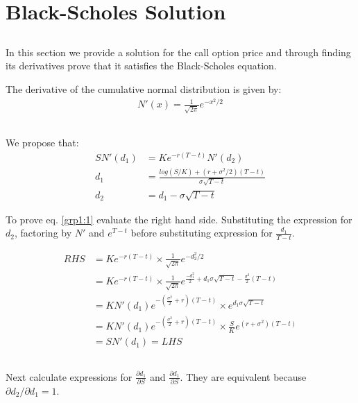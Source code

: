 \documentclass{sig-alternate-05-2015}
\begin{document}
\section{Black-Scholes Solution}
\subsection{}
In this section we provide a solution for the call option price and through finding its derivatives prove that it satisfies the Black-Scholes equation. 

The derivative of the cumulative normal distribution is given by:
\begin{align}
N'(x) = \frac{1}{\sqrt{2\pi}}e^{-x^2/2}
\end{align}

\subsection{}

We propose that:
\begin{subequations}\label{grp1}
\begin{align}
SN'(d_1) &= Ke^{-r(T-t)}N'(d_2)\label{grp1:1}\\
d_1 &= \frac{log(S/K) + (r+\sigma^2/2)(T-t)}{\sigma\sqrt{T-t}}\label{grp1:2}\\
d_2 &= d_1 - \sigma\sqrt{T-t}\label{grp1:3}
\end{align}
\end{subequations}

To prove eq. \ref{grp1:1} evaluate the right hand side. Substituting the expression for $d_2$, factoring by $N'$ and $e^{T-t}$ before
substituting expression for $\frac{d_1}{T-t}$.

\begin{align*}\label{grp2}
RHS &= Ke^{-r(T-t)}\times \frac{1}{\sqrt{2\pi}}e^{-d_2^2/2} \\
&= Ke^{-r(T-t)}\times \frac{1}{\sqrt{2\pi}}e^{\frac{-d_1^2}{2}+d_1\sigma\sqrt{T-t}-\frac{\sigma^2}{2}(T-t)}\\
&= KN'(d_1)e^{-(\frac{\sigma^2}{2} + r)(T-t)}\times e^{d_1\sigma\sqrt{T-t}} \\
&= KN'(d_1)e^{-(\frac{\sigma^2}{2} + r)(T-t)} \times \frac{S}{K}e^{(r+\sigma^2)(T-t)} \\
 &= SN'(d_1) = LHS
\end{align*}

\subsection{}
Next calculate expressions for $\frac{\partial d_1}{\partial S}$ and $\frac{\partial d_1}{\partial S}$. They are equivalent because $\partial d_2/ \partial d_1 = 1$.
\end{document}
